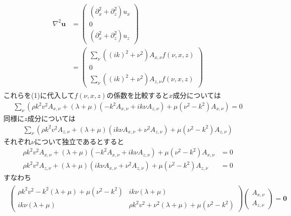 \documentclass[uplatex,a4j,11pt,dvipdfmx]{jsarticle}
\begin{document}
\begin{align}
  \begin{split}
    \nabla^2{\bm u}&=\left(
      \begin{array}{c}
        (\partial_x^2+\partial_z^2)u_x\\
        0\\
        (\partial_x^2+\partial_z^2)u_z
      \end{array}
    \right)\\
    &=\left(
      \begin{array}{c}
        \sum_\nu ((ik)^2+\nu^2)A_{x,\nu}f(\nu,x,z)\\
        0\\
        \sum_\nu ((ik)^2+\nu^2)A_{z,\nu}f(\nu,x,z)
      \end{array}
    \right)
  \end{split}
\end{align}
これらを(1)に代入して$f(\nu,x,z)$の係数を比較すると$x$成分については
\begin{align}
  \sum_\nu\left(\rho k^2v^2A_{x,\nu}+(\lambda+\mu)(-k^2A_{x,\nu}+ik\nu A_{z,\nu})+\mu(\nu^2-k^2)A_{x,\nu}\right)=0
\end{align}
同様に$z$成分については
\begin{align}
  \sum_\nu\left(\rho k^2v^2A_{z,\nu}+(\lambda+\mu)(ik\nu A_{x,\nu}+\nu^2A_{z,\nu})+\mu(\nu^2-k^2)A_{z,\nu}\right)
\end{align}
それぞれ$\nu$について独立であるとすると
\begin{align*}
  \rho k^2v^2A_{x,\nu}+(\lambda+\mu)(-k^2A_{x,\nu}+ik\nu A_{z,\nu})+\mu(\nu^2-k^2)A_{x,\nu}&=0\\
  \rho k^2v^2A_{z,\nu}+(\lambda+\mu)(ik\nu A_{x,\nu}+\nu^2A_{z,\nu})+\mu(\nu^2-k^2)A_{z,\nu}&=0
\end{align*}
すなわち
\begin{align}
  \begin{split}
    \left(
      \begin{array}{cc}
      \rho k^2v^2-k^2(\lambda+\mu)+\mu(\nu^2-k^2)&ik\nu(\lambda+\mu)\\
      ik\nu(\lambda+\mu)&\rho k^2v^2+\nu^2(\lambda+\mu)+\mu(\nu^2-k^2)
    \end{array}
    \right)
    \left(
      \begin{array}{c}
        A_{x,\nu}\\A_{z,\nu}
      \end{array}
    \right)
    ={\bm 0}
  \end{split}
\end{align}
\end{document}
